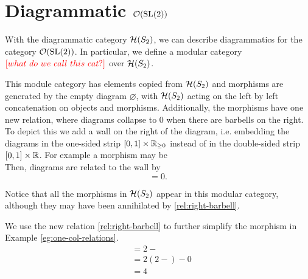 \section{Diagrammatic $\mathcal{O}(\operatorname{SL}(2))$}

With the diagrammatic category $\mathcal{H}(S_2)$, we can describe diagrammatics for the category $\mathcal{O}(\operatorname{SL}(2))$. In particular, we define a modular category ${\color{red}[what~do~we~call~this~cat?]}$ over $\mathcal{H}(S_2)$. %

This module category has elements copied from $\mathcal{H}(S_2)$ and morphisms are generated by the empty diagram $\varnothing$, with $\mathcal{H}(S_2)$ acting on the left by left concatenation on objects and morphisms. Additionally, the morphisms have one new relation, where diagrams collapse to $0$ when there are barbells on the right. To depict this we add a wall on the right of the diagram, i.e. embedding the diagrams in the one-sided strip $[0,1] \times \mathbb{R}_{\geq 0}$ instead of in the double-sided strip $[0,1] \times \mathbb{R}$. For example a morphism may be
\begin{equation*}
    
\end{equation*}
Then, diagrams are related to the wall by
\begin{equation}
    \label{rel:right-barbell}
     = 0.
\end{equation}


Notice that all the morphisms in $\mathcal{H}(S_2)$ appear in this modular category, although they may have been annihilated by \eqref{rel:right-barbell}.

\begin{example}
    We use the new relation \eqref{rel:right-barbell} to further simplify the morphism in Example \eqref{eg:one-col-relations}.
    \begin{align*}
        
         & = 2  - 
         \\ & = 2 \left( 2  -  \right) - 0
         \\ & = 4 
    \end{align*}
\end{example}

